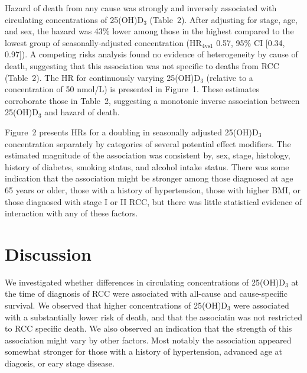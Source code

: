 \documentclass[a4paper,11pt]{article}
\begin{document}
Hazard of death from any cause was strongly and inversely associated with 
circulating concentrations of 25(OH)D$_3$ (Table~2). After adjusting for 
stage, age, and sex, the hazard was 43\% lower among those in the highest 
compared to the lowest group of seasonally-adjusted concentration 
(HR$_{4\text{vs}1}$ 0.57, 95\% CI [0.34, 0.97]). A competing risks analysis 
found no evidence of heterogeneity by cause of death, suggesting that this 
association was not specific to deaths from RCC (Table~2). The HR for 
continuously varying 25(OH)D$_3$ (relative to a concentration of 50 nmol/L) is 
presented in Figure~1. These estimates corroborate those in Table~2, suggesting 
a monotonic inverse association between 25(OH)D$_3$ and hazard of death.

Figure~2 presents HRs for a doubling in seasonally adjusted 25(OH)D$_3$ 
concentration separately by categories of several potential effect modifiers. 
The estimated magnitude of the association was consistent by, sex, stage, 
histology, history of diabetes, smoking status, and alcohol intake status. 
There was some indication that the association might be stronger among those 
diagnosed at age 65 years or older, those with a history of hypertension, those 
with higher BMI, or those diagnosed with stage I or II RCC, but there was 
little statistical evidence of interaction with any of these factors. 

\section*{Discussion}
We investigated whether differences in circulating concentrations of 
25(OH)D$_3$ at the time of diagnosis of RCC were associated with all-cause and 
cause-specific survival. We observed that higher concentrations of 25(OH)D$_3$ 
were associated with a substantially lower risk of death, and that the 
associatin was not restricted to RCC specific death. We also observed an 
indication that the strength of this association might vary by other factors.
Most notably the association appeared somewhat stronger for those with a 
history of hypertension, advanced age at diagosis, or eary stage disease.

\clearpage


\end{document}
